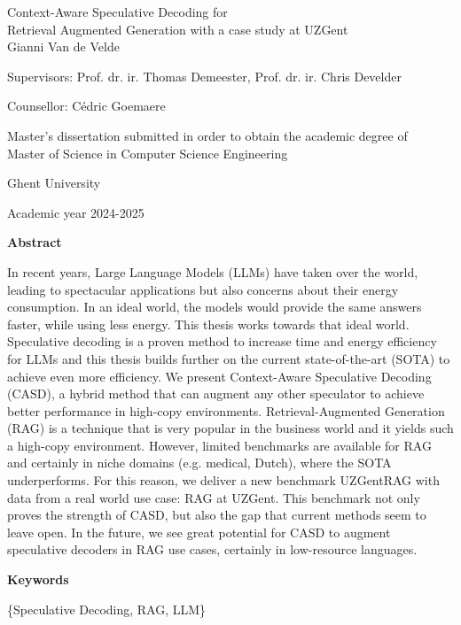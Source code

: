 \newpage
\begin{center}
    \LARGE
    Context-Aware Speculative Decoding for \\Retrieval Augmented
Generation with a case study at UZGent \\
    
    \vspace{1cm}
    \large
    Gianni Van de Velde
    
    Supervisors: Prof. dr. ir. Thomas Demeester, Prof. dr. ir. Chris Develder
    
    Counsellor: Cédric Goemaere
    
    Master's dissertation submitted in order to obtain the academic degree of\\
    Master of Science in Computer Science Engineering
    
    Ghent University
    
    Academic year 2024-2025
\end{center}

\vspace{0.5cm}
\begin{center}
    \textbf{\Large Abstract}
\end{center}

In recent years, Large Language Models (LLMs) have taken over the world, leading to spectacular applications but also concerns about their energy consumption. In an ideal world, the models would provide the same answers faster, while using less energy. This thesis works towards that ideal world. Speculative decoding is a proven method to increase time and energy efficiency for LLMs and this thesis builds further on the current state-of-the-art (SOTA) to achieve even more efficiency. We present Context-Aware Speculative Decoding (CASD), a hybrid method that can augment any other speculator to achieve better performance in high-copy environments. Retrieval-Augmented Generation (RAG) is a technique that is very popular in the business world and it yields such a high-copy environment. However, limited benchmarks are available for RAG and certainly in niche domains (e.g. medical, Dutch), where the SOTA underperforms. For this reason, we deliver a new benchmark UZGentRAG with data from a real world use case: RAG at UZGent. This benchmark not only proves the strength of CASD, but also the gap that current methods seem to leave open. In the future, we see great potential for CASD to augment speculative decoders in RAG use cases, certainly in low-resource languages.

\begin{center}
    \textbf{\Large Keywords}
\end{center}
\begin{center}
    \{Speculative Decoding, RAG, LLM\}
\end{center}
